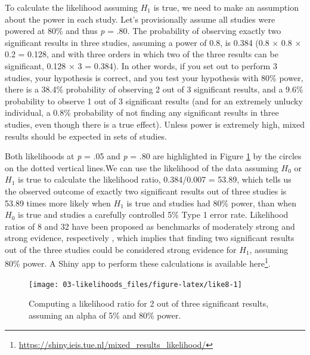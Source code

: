 \documentclass[
  oneside]{krantz}
\renewcommand{\href}[2]{#2\footnote{\url{#1}}}
\begin{document}
To calculate the likelihood assuming \(H_1\) is true, we need to make an assumption about the power in each study. Let's provisionally assume all studies were powered at 80\% and thus \emph{p} = .80. The probability of observing exactly two significant results in three studies, assuming a power of 0.8, is 0.384 (0.8 × 0.8 × 0.2 = 0.128, and with three orders in which two of the three results can be significant, 0.128 × 3 = 0.384). In other words, if you set out to perform 3 studies, your hypothesis is correct, and you test your hypothesis with 80\% power, there is a 38.4\% probability of observing 2 out of 3 significant results, and a 9.6\% probability to observe 1 out of 3 significant results (and for an extremely unlucky individual, a 0.8\% probability of not finding any significant results in three studies, even though there is a true effect). Unless power is extremely high, mixed results should be expected in sets of studies.

Both likelihoods at \emph{p} = .05 and \emph{p} = .80 are highlighted in Figure \ref{fig:like8} by the circles on the dotted vertical lines.We can use the likelihood of the data assuming \(H_0\) or \(H_1\) is true to calculate the likelihood ratio, 0.384/0.007 = 53.89, which tells us the observed outcome of exactly two significant results out of three studies is 53.89 times more likely when \(H_1\) is true and studies had 80\% power, than when \(H_0\) is true and studies a carefully controlled 5\% Type 1 error rate. Likelihood ratios of 8 and 32 have been proposed as benchmarks of moderately strong and strong evidence, respectively \citep{royall_statistical_1997}, which implies that finding two significant results out of the three studies could be considered strong evidence for \(H_1\), assuming 80\% power. A Shiny app to perform these calculations is available \href{https://shiny.ieis.tue.nl/mixed_results_likelihood/}{here}.



\begin{figure}

{\centering \texttt{[image: 03-likelihoods\_files/figure-latex/like8-1]} 

}

\caption{Computing a likelihood ratio for 2 out of three significant results, assuming an alpha of 5\% and 80\% power.}\label{fig:like8}
\end{figure}
\end{document}
